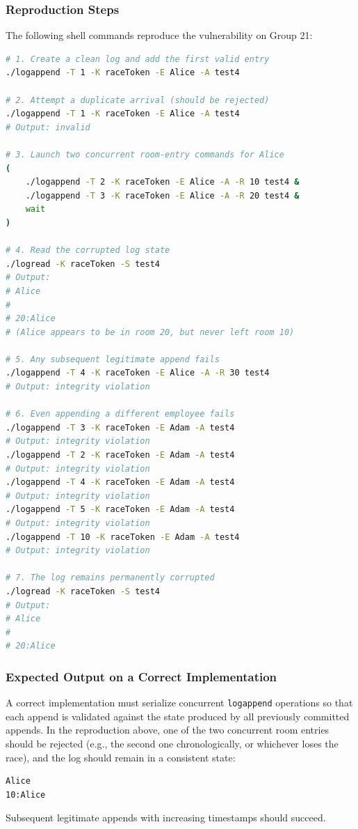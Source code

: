\documentclass[a4paper, 12pt]{article}
\begin{document}
    \subsubsection{Reproduction Steps}
    The following shell commands reproduce the vulnerability on Group 21:

    \begin{lstlisting}[language=bash]
# 1. Create a clean log and add the first valid entry
./logappend -T 1 -K raceToken -E Alice -A test4

# 2. Attempt a duplicate arrival (should be rejected)
./logappend -T 1 -K raceToken -E Alice -A test4
# Output: invalid

# 3. Launch two concurrent room-entry commands for Alice
(
    ./logappend -T 2 -K raceToken -E Alice -A -R 10 test4 &
    ./logappend -T 3 -K raceToken -E Alice -A -R 20 test4 &
    wait
)

# 4. Read the corrupted log state
./logread -K raceToken -S test4
# Output:
# Alice
#
# 20:Alice
# (Alice appears to be in room 20, but never left room 10)

# 5. Any subsequent legitimate append fails
./logappend -T 4 -K raceToken -E Alice -A -R 30 test4
# Output: integrity violation

# 6. Even appending a different employee fails
./logappend -T 3 -K raceToken -E Adam -A test4
# Output: integrity violation
./logappend -T 2 -K raceToken -E Adam -A test4
# Output: integrity violation
./logappend -T 4 -K raceToken -E Adam -A test4
# Output: integrity violation
./logappend -T 5 -K raceToken -E Adam -A test4
# Output: integrity violation
./logappend -T 10 -K raceToken -E Adam -A test4
# Output: integrity violation

# 7. The log remains permanently corrupted
./logread -K raceToken -S test4
# Output:
# Alice
#
# 20:Alice
    \end{lstlisting}

    \subsubsection{Expected Output on a Correct Implementation}
    A correct implementation must serialize concurrent \texttt{logappend} operations so that each append is validated against the state produced by all previously committed appends. In the reproduction above, one of the two concurrent room entries should be rejected (e.g., the second one chronologically, or whichever loses the race), and the log should remain in a consistent state:
    \begin{lstlisting}
Alice
10:Alice
    \end{lstlisting}
    Subsequent legitimate appends with increasing timestamps should succeed.
\end{document}
